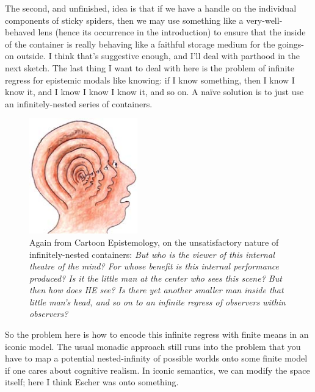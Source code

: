 The second, and unfinished, idea is that if we have a handle on the individual components of sticky spiders, then we may use something like a very-well-behaved lens (hence its occurrence in the introduction) to ensure that the inside of the container is really behaving like a faithful storage medium for the goings-on outside. I think that's suggestive enough, and I'll deal with parthood in the next sketch. The last thing I want to deal with here is the problem of infinite regress for epistemic modals like knowing: if I know something, then I know I know it, and I know I know I know it, and so on. A na\"{i}ve solution is to just use an infinitely-nested series of containers.

\begin{figure}[h!]
\centering
\includegraphics[height=5cm]{figures/bubbles/infinity}
\caption{Again from Cartoon Epistemology, on the unsatisfactory nature of infinitely-nested containers: \emph{But who is the viewer of this internal theatre of the mind? For whose benefit is this internal performance produced? Is it the little man at the center who sees this scene? But then how does HE see? Is there yet another smaller man inside that little man's head, and so on to an infinite regress of observers within observers?}}
\label{fig:infinity}
\end{figure}

\clearpage

So the problem here is how to encode this infinite regress with finite means in an iconic model. The usual monadic approach still runs into the problem that you have to map a potential nested-infinity of possible worlds onto some finite model if one cares about cognitive realism. In iconic semantics, we can modify the space itself; here I think Escher was onto something.

